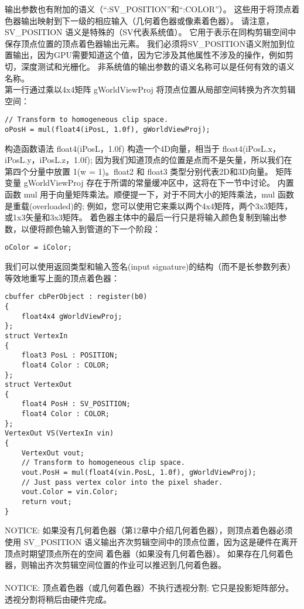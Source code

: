 \begin{flushleft}
输出参数也有附加的语义（“:SV\_POSITION”和“:COLOR”）。 这些用于将顶点着色器输出映射到下一级的相应输入（几何着色器或像素着色器）。 请注意，SV\_POSITION 语义是特殊的（SV代表系统值）。 它用于表示在同构剪辑空间中保存顶点位置的顶点着色器输出元素。 我们必须将SV\_POSITION语义附加到位置输出，因为GPU需要知道这个值，因为它涉及其他属性不涉及的操作，例如剪切，深度测试和光栅化。 非系统值的输出参数的语义名称可以是任何有效的语义名称。\\
第一行通过乘以4x4矩阵 gWorldViewProj 将顶点位置从局部空间转换为齐次剪辑空间：\\
\end{flushleft}
\begin{lstlisting}
// Transform to homogeneous clip space.
oPosH = mul(float4(iPosL, 1.0f), gWorldViewProj);
\end{lstlisting}
\begin{flushleft}
构造函数语法 float4(iPosL，1.0f) 构造一个4D向量，相当于 float4(iPosL.x，iPosL.y，iPosL.z，1.0f); 因为我们知道顶点的位置是点而不是矢量，所以我们在第四个分量中放置 1(w = 1)。float2 和 float3 类型分别代表2D和3D向量。 矩阵变量 gWorldViewProj 存在于所谓的常量缓冲区中，这将在下一节中讨论。 内置函数 mul 用于向量矩阵乘法。顺便提一下，对于不同大小的矩阵乘法，mul 函数是重载(overloaded)的; 例如，您可以使用它来乘以两个4x4矩阵，两个3x3矩阵，或1x3矢量和3x3矩阵。 着色器主体中的最后一行只是将输入颜色复制到输出参数，以便将颜色输入到管道的下一个阶段：\\
\end{flushleft}
\begin{lstlisting}
oColor = iColor;
\end{lstlisting}
\begin{flushleft}
我们可以使用返回类型和输入签名(input signature)的结构（而不是长参数列表）等效地重写上面的顶点着色器：\\
\end{flushleft}
\begin{lstlisting}
cbuffer cbPerObject : register(b0)
{
    float4x4 gWorldViewProj;
};
struct VertexIn
{
    float3 PosL : POSITION;
    float4 Color : COLOR;
};
struct VertexOut
{
    float4 PosH : SV_POSITION;
    float4 Color : COLOR;
};
VertexOut VS(VertexIn vin)
{
    VertexOut vout;
    // Transform to homogeneous clip space.
    vout.PosH = mul(float4(vin.PosL, 1.0f), gWorldViewProj);
    // Just pass vertex color into the pixel shader.
    vout.Color = vin.Color;
    return vout;
}
\end{lstlisting}
\begin{flushleft}
NOTICE: 如果没有几何着色器（第12章中介绍几何着色器），则顶点着色器必须使用 SV\_POSITION 语义输出齐次剪辑空间中的顶点位置，因为这是硬件在离开顶点时期望顶点所在的空间 着色器（如果没有几何着色器）。 如果存在几何着色器，则输出齐次剪辑空间位置的作业可以推迟到几何着色器。\\
~\\
NOTICE: 顶点着色器（或几何着色器）不执行透视分割; 它只是投影矩阵部分。 透视分割将稍后由硬件完成。
\end{flushleft}

